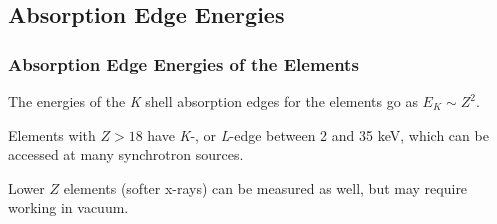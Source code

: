 \subsection{Absorption Edge Energies}
\begin{frame} \frametitle{Absorption Edge Energies of the Elements}
  \small


  \begin{cenpage}{103mm}


    The energies of the {\slshape{K}} shell absorption edges for the
    elements go as  $E_K \sim Z^2$.


    {}


    Elements with $Z > 18$ have {\slshape{K}}-, or {\slshape{L}}-edge
    between 2 and 35 keV, which can be accessed at many synchrotron
    sources.

    \vmm
    Lower $Z$ elements (softer x-rays) can be measured as well, but may
    require working in vacuum.
  \end{cenpage}

\vfill
\end{frame}
